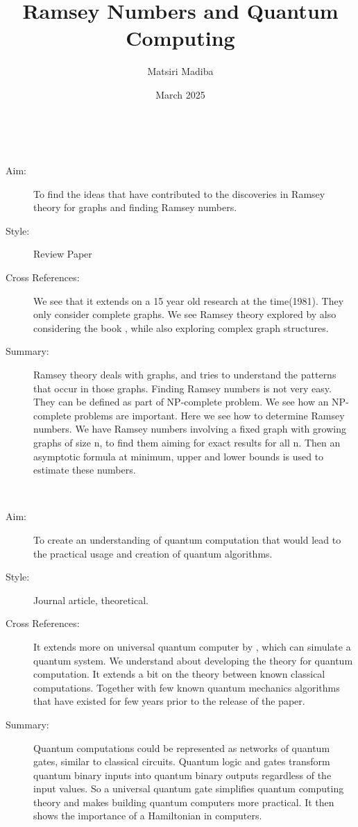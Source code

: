 \documentclass{Assignment}
\author{Matsiri Madiba}
\date{March 2025}
\title{Ramsey Numbers and Quantum Computing}
\begin{document}
\maketitle
\cite{burr1981generalized}~
\begin{description}
	\item[Aim:]
To find the ideas that have contributed to the discoveries in Ramsey theory for graphs and finding Ramsey numbers.
\item[Style:]
Review Paper
\item[Cross References:]
We see that it extends on a 15 year old research at the time(1981). They only consider complete graphs. We see Ramsey theory explored by also considering the book \cite{graham1980ramsey}, while also exploring complex graph structures.
\item [Summary:]
Ramsey theory deals with graphs, and tries to understand the patterns that occur in those graphs.
Finding Ramsey numbers is not very easy.
They can be defined as part of NP-complete problem.
We see how an NP-complete problems are important.
Here we see how to determine Ramsey numbers.  
We have Ramsey numbers involving a fixed graph with growing graphs of size n, to find them aiming for exact results for all n. 
Then an asymptotic formula at minimum, upper and lower bounds is used to estimate these numbers.  

\end{description}
\newpage
\cite{f3197c3a-bce3-3c72-b6d6-c1ee34ac9328}~
	    \begin{description}
			\item [ Aim:]
		To create an understanding of quantum computation that would lead to the practical usage and creation of quantum algorithms.
		\item[Style:]
		Journal article, theoretical.
		\item[Cross References:]
		It extends more on universal quantum computer by \cite{deutsch1985quantum}, which can simulate a quantum system. 
		We understand about developing the theory  for quantum computation. 
		It extends a bit on the theory between known classical computations. 
		Together with few known quantum mechanics algorithms that have existed for few years prior to the release of the paper.
		\item [Summary:]
		Quantum computations could be represented as networks of quantum gates, similar to classical circuits.
		Quantum logic and gates transform quantum binary inputs into quantum binary outputs regardless of the input values.
		So a universal quantum gate simplifies quantum computing theory and makes building quantum computers more practical. 
		It then shows the importance of a Hamiltonian in computers.
	\end{description}
\end{document}

